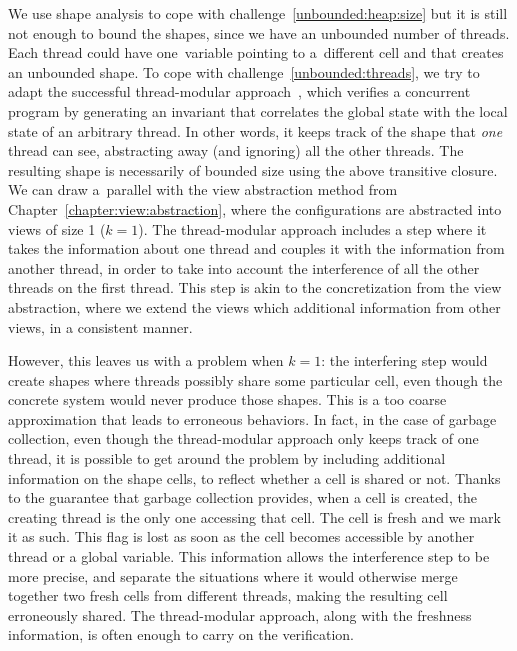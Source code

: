 %


We use shape analysis to cope with challenge~\ref{unbounded:heap:size}
but it is still not enough to bound the shapes, since we have an
unbounded number of threads. Each thread could have one~variable
pointing to a~different cell and that creates an unbounded shape.
%
%
To cope with challenge~\ref{unbounded:threads}, we try to adapt the
successful thread-modular approach~\cite{BLMRS:cav08}, which verifies
a concurrent program by generating an invariant %
that correlates the global state with the local state of an arbitrary
thread.
%
In other words, it keeps track of the shape that \emph{one} thread can
see, %
abstracting away (and ignoring) all the other threads.
%
The resulting shape is necessarily of bounded size using the above
transitive closure.
We can draw a~parallel with the view abstraction method from
Chapter~\ref{chapter:view:abstraction}, where the configurations are
abstracted into views of size 1 ($k=1$).
%
%
The thread-modular approach includes a step where it takes the
information about one thread and couples it with the information from
another thread, in order to take into account %
the interference %
of all the other threads on the first thread.
%
This step is akin to the concretization from the view abstraction,
where we extend the views which additional information from other
views, in a consistent manner.

However, this leaves us with a problem when $k=1$: the interfering
step would create shapes where threads possibly share some particular
cell, even though the concrete system would never produce those
shapes.
%
This is a too coarse approximation that leads to erroneous behaviors.
%
%
In fact, in the case of garbage collection, even though the
thread-modular approach only keeps track of one thread, it is possible
to get around the problem by including additional information on the
shape cells, to reflect whether a cell is shared or not. Thanks to the
guarantee that garbage collection provides, when a cell is created,
the creating thread is the only one accessing that cell. The cell is
fresh and we mark it as such. This flag is lost as soon as the cell
becomes accessible by another thread or a global variable.
%
%
This information allows the interference step to be more precise, and
separate the situations where it would otherwise merge together two
fresh cells from different threads, making the resulting cell
erroneously shared. The thread-modular approach, along with the
freshness information, is often enough to carry on the verification.

